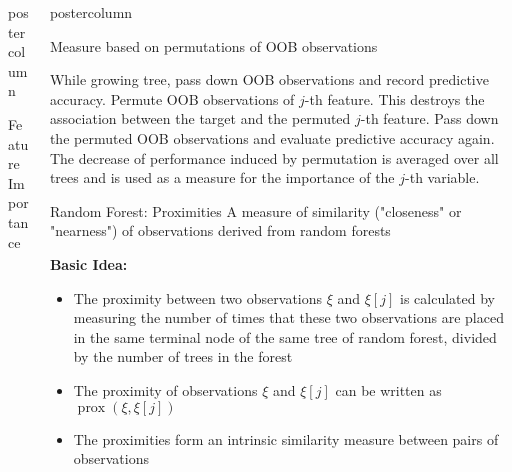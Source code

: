 \documentclass{beamer}
\newlength{\columnheight} %
\begin{document}
\begin{frame}[fragile]{}
\begin{columns}
\begin{column}{.31\textwidth}
\begin{beamercolorbox}[center]{postercolumn}
\begin{minipage}{.98\textwidth}
{\begin{myblock}{Feature Importance}
	    	\end{myblock}
					}
			\end{minipage}
		\end{beamercolorbox}
	\end{column}
	\begin{column}{.31\textwidth}
		\begin{beamercolorbox}[center]{postercolumn}
			\begin{minipage}{.98\textwidth}
				\parbox[t][\columnheight]{\textwidth}{
				    \begin{myblock}{ }
			\begin{algorithm}[H]
            \small
            \caption{Measure based on permutations of OOB observations}
            \begin{algorithmic}[0]
            \State While growing tree, pass down OOB observations and record predictive accuracy.
            \State Permute OOB observations of $j$-th feature. This destroys the association between the target and the permuted $j$-th feature.
            \State Pass down the permuted OOB observations and evaluate predictive accuracy again.
            \State The decrease of performance induced by permutation is averaged over all trees and is used as a measure for the importance of the $j$-th variable.
            \end{algorithmic}
            \end{algorithm}
            
            \end{myblock}
						\begin{myblock}{Random Forest: Proximities}
			A measure of similarity ("closeness" or "nearness") of observations derived from random forests\\
						\begin{codebox} \textbf{Basic Idea: }	\end{codebox}
	        \begin{itemize}
            \item The proximity between two observations $\xi$ and $\xi[j]$ is calculated by measuring the number of times that these two observations are placed in the same terminal node of the same tree of random forest, divided by the number of trees in the forest
            \item The proximity of observations $\xi$ and $\xi[j]$ can be written as $\operatorname{prox}\left(\xi, \xi[j]\right)$
            \item The proximities form an intrinsic similarity measure between pairs of observations
            \end{itemize}


\end{myblock}}
\end{minipage}
\end{beamercolorbox}
\end{column}
\end{columns}
\end{frame}
\end{document}
